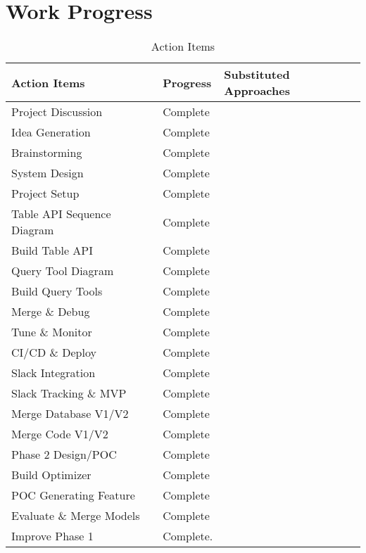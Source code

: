 \section{Work Progress}
\begin{table}[H]
    \centering
    \caption{Action Items}
    \label{tbl:task-breakdown-status}
    \begin{tabular}{|p{6cm}|p{3cm}|p{5cm}|}
        \hline
        \textbf{Action Items} & \textbf{Progress} & \textbf{Substituted Approaches}  \\
        \hline
        Project Discussion & Complete &  \\
        \hline
        Idea Generation & Complete &  \\
        \hline
        Brainstorming & Complete & \\
        \hline
        System Design & Complete & \\
        \hline
        Project Setup & Complete & \\
        \hline
        Table API Sequence Diagram & Complete & \\
        \hline
        Build Table API & Complete & \\
        \hline
        Query Tool Diagram & Complete & \\
        \hline
        Build Query Tools & Complete & \\
        \hline
        Merge \& Debug & Complete & \\
        \hline
        Tune \& Monitor  & Complete & \\
        \hline
        CI/CD \& Deploy & Complete & \\
        \hline
        Slack Integration & Complete & \\
        \hline
        Slack Tracking \& MVP & Complete & \\
        \hline
        Merge Database V1/V2 & Complete & \\
        \hline
        Merge Code V1/V2 & Complete & \\
        \hline
        Phase 2 Design/POC & Complete & \\
        \hline
        Build Optimizer & Complete & \\
        \hline
        POC Generating Feature & Complete & \\
        \hline
        Evaluate \& Merge Models & Complete & \\
        \hline
        Improve Phase 1 & Complete. & \\
        \hline

\end{tabular}
\end{table}
